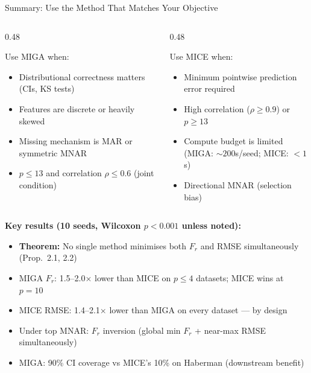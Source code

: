 \documentclass[aspectratio=169,12pt]{beamer}
\newcommand{\MIGA}{\textsc{MIGA}}
\newcommand{\MICE}{\textsc{MICE}}
\begin{document}
\begin{frame}{Summary: Use the Method That Matches Your Objective}

\begin{columns}
\begin{column}{0.48\textwidth}
\begin{block}{Use \MIGA{} when:}
\begin{itemize}
  \item Distributional correctness matters (CIs, KS tests)
  \item Features are discrete or heavily skewed
  \item Missing mechanism is MAR or symmetric MNAR
  \item $p \leq 13$ and correlation $\rho \leq 0.6$ (joint condition)
\end{itemize}
\end{block}
\end{column}

\begin{column}{0.48\textwidth}
\begin{block}{Use \MICE{} when:}
\begin{itemize}
  \item Minimum pointwise prediction error required
  \item High correlation ($\rho \geq 0.9$) or $p \geq 13$
  \item Compute budget is limited \\
        (\MIGA{}: ${\sim}200$s/seed; \MICE{}: ${<}1$s)
  \item Directional MNAR (selection bias)
\end{itemize}
\end{block}
\end{column}
\end{columns}

\bigskip
\textbf{Key results (10 seeds, Wilcoxon $p < 0.001$ unless noted):}
\begin{itemize}
  \item \textbf{Theorem:} No single method minimises both $F_r$ and RMSE simultaneously (Prop.\ 2.1, 2.2)
  \item \MIGA{} $F_r$: 1.5--2.0$\times$ lower than \MICE{} on $p \leq 4$ datasets; \MICE{} wins at $p=10$
  \item \MICE{} RMSE: 1.4--2.1$\times$ lower than \MIGA{} on every dataset — by design
  \item Under top MNAR: $F_r$ inversion (global min $F_r$ + near-max RMSE simultaneously)
  \item \MIGA{}: 90\% CI coverage vs \MICE{}'s 10\% on Haberman (downstream benefit)
\end{itemize}

\end{frame}
\end{document}
